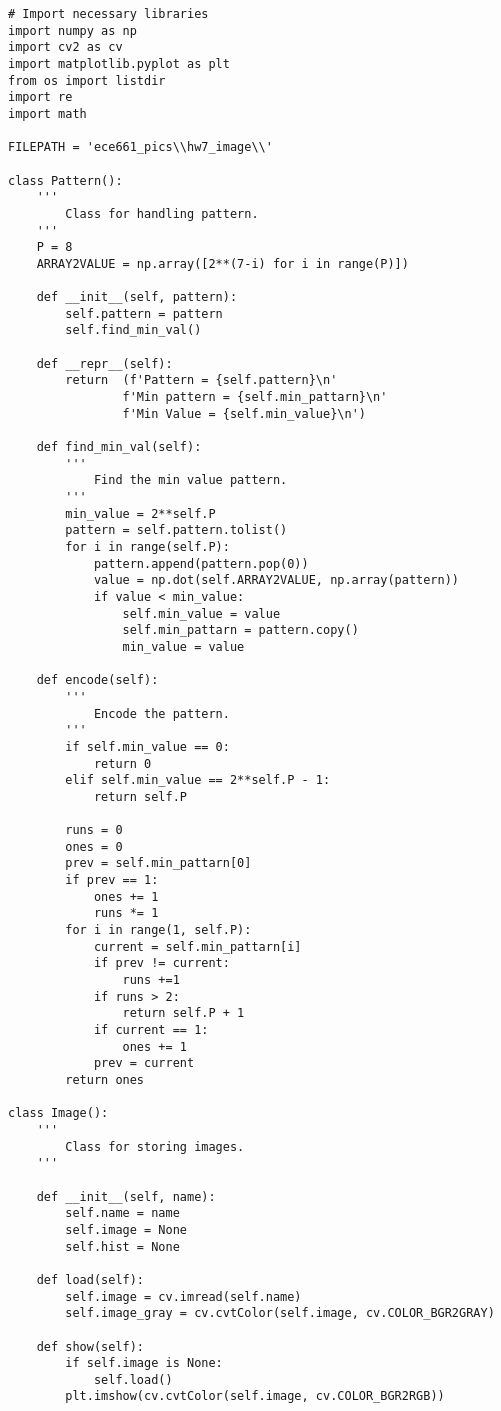 \documentclass[11pt]{article}
\begin{document}
\begin{lstlisting}
# Import necessary libraries
import numpy as np
import cv2 as cv
import matplotlib.pyplot as plt
from os import listdir
import re
import math

FILEPATH = 'ece661_pics\\hw7_image\\'

class Pattern():
    ''' 
        Class for handling pattern.
    '''
    P = 8
    ARRAY2VALUE = np.array([2**(7-i) for i in range(P)])

    def __init__(self, pattern):
        self.pattern = pattern 
        self.find_min_val()
    
    def __repr__(self):
        return  (f'Pattern = {self.pattern}\n'
                f'Min pattern = {self.min_pattarn}\n'
                f'Min Value = {self.min_value}\n')
    
    def find_min_val(self):
        ''' 
            Find the min value pattern.
        '''
        min_value = 2**self.P
        pattern = self.pattern.tolist()
        for i in range(self.P):
            pattern.append(pattern.pop(0))
            value = np.dot(self.ARRAY2VALUE, np.array(pattern))
            if value < min_value:
                self.min_value = value
                self.min_pattarn = pattern.copy()
                min_value = value

    def encode(self):
        '''
            Encode the pattern.
        '''
        if self.min_value == 0:
            return 0
        elif self.min_value == 2**self.P - 1:
            return self.P
        
        runs = 0
        ones = 0
        prev = self.min_pattarn[0]
        if prev == 1:
            ones += 1
            runs *= 1
        for i in range(1, self.P):
            current = self.min_pattarn[i]
            if prev != current:
                runs +=1 
            if runs > 2:
                return self.P + 1
            if current == 1:
                ones += 1
            prev = current
        return ones

class Image():
    ''' 
        Class for storing images.
    '''
    
    def __init__(self, name):
        self.name = name    
        self.image = None  
        self.hist = None

    def load(self):
        self.image = cv.imread(self.name)
        self.image_gray = cv.cvtColor(self.image, cv.COLOR_BGR2GRAY)

    def show(self):
        if self.image is None:
            self.load()
        plt.imshow(cv.cvtColor(self.image, cv.COLOR_BGR2RGB))
    

\end{lstlisting}
\end{document}
